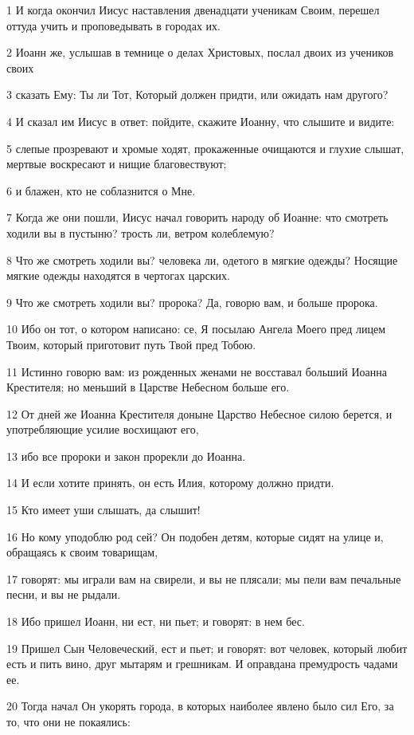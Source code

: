 \par 1 И когда окончил Иисус наставления двенадцати ученикам Своим, перешел оттуда учить и проповедывать в городах их.
\par 2 Иоанн же, услышав в темнице о делах Христовых, послал двоих из учеников своих
\par 3 сказать Ему: Ты ли Тот, Который должен придти, или ожидать нам другого?
\par 4 И сказал им Иисус в ответ: пойдите, скажите Иоанну, что слышите и видите:
\par 5 слепые прозревают и хромые ходят, прокаженные очищаются и глухие слышат, мертвые воскресают и нищие благовествуют;
\par 6 и блажен, кто не соблазнится о Мне.
\par 7 Когда же они пошли, Иисус начал говорить народу об Иоанне: что смотреть ходили вы в пустыню? трость ли, ветром колеблемую?
\par 8 Что же смотреть ходили вы? человека ли, одетого в мягкие одежды? Носящие мягкие одежды находятся в чертогах царских.
\par 9 Что же смотреть ходили вы? пророка? Да, говорю вам, и больше пророка.
\par 10 Ибо он тот, о котором написано: се, Я посылаю Ангела Моего пред лицем Твоим, который приготовит путь Твой пред Тобою.
\par 11 Истинно говорю вам: из рожденных женами не восставал больший Иоанна Крестителя; но меньший в Царстве Небесном больше его.
\par 12 От дней же Иоанна Крестителя доныне Царство Небесное силою берется, и употребляющие усилие восхищают его,
\par 13 ибо все пророки и закон прорекли до Иоанна.
\par 14 И если хотите принять, он есть Илия, которому должно придти.
\par 15 Кто имеет уши слышать, да слышит!
\par 16 Но кому уподоблю род сей? Он подобен детям, которые сидят на улице и, обращаясь к своим товарищам,
\par 17 говорят: мы играли вам на свирели, и вы не плясали; мы пели вам печальные песни, и вы не рыдали.
\par 18 Ибо пришел Иоанн, ни ест, ни пьет; и говорят: в нем бес.
\par 19 Пришел Сын Человеческий, ест и пьет; и говорят: вот человек, который любит есть и пить вино, друг мытарям и грешникам. И оправдана премудрость чадами ее.
\par 20 Тогда начал Он укорять города, в которых наиболее явлено было сил Его, за то, что они не покаялись:
